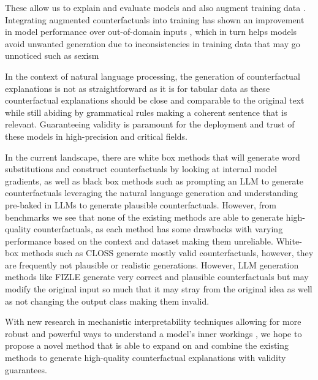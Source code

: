 These allow us to explain and evaluate models and also augment training data \cite{kaushik_learning_2020}. Integrating augmented counterfactuals into training has shown an improvement in model performance over out-of-domain inputs \cite{kaushik_learning_2020, samory_call_2021}, which in turn helps models avoid unwanted generation due to inconsistencies in training data that may go unnoticed such as sexism \cite{sen_how_2021}

In the context of natural language processing, the generation of counterfactual explanations is not as straightforward as it is for tabular data as these counterfactual explanations should be close and comparable to the original text while still abiding by grammatical rules making a coherent sentence that is relevant. Guaranteeing validity is paramount for the deployment and trust of these models in high-precision and critical fields.

In the current landscape, there are white box methods that will generate word substitutions and construct counterfactuals \cite{pope_text_2021} by looking at internal model gradients, as well as black box methods such as prompting an LLM to generate counterfactuals \cite{wu_polyjuice_2021} leveraging the natural language generation and understanding pre-baked in LLMs to generate plausible counterfactuals. However, from benchmarks \cite{mcaleese_comparative_2024} we see that none of the existing methods are able to generate high-quality counterfactuals, as each method has some drawbacks with varying performance based on the context and dataset making them unreliable. White-box methods such as CLOSS generate mostly valid counterfactuals, however, they are frequently not plausible or realistic generations. However, LLM generation methods like FIZLE generate very correct and plausible counterfactuals but may modify the original input so much that it may stray from the original idea as well as not changing the output class making them invalid.

With new research in mechanistic interpretability techniques allowing for more robust and powerful ways to understand a model's inner workings \cite{ghandeharioun_patchscopes_2024}, we hope to propose a novel method that is able to expand on and combine the existing methods to generate high-quality counterfactual explanations with validity guarantees.